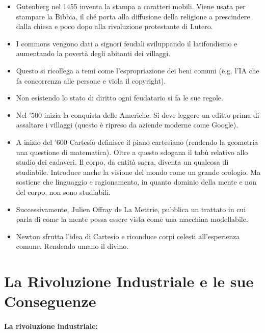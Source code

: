\begin{itemize}
  \item Gutenberg nel 1455 inventa la stampa a caratteri mobili. Viene usata per stampare la Bibbia, il ché porta alla diffusione della religione a prescindere dalla chiesa e poco dopo alla rivoluzione protestante di Lutero.
  \item I commons vengono dati a signori feudali sviluppando il latifondismo e aumentando la povertà degli abitanti dei villaggi. 
  \item Questo si ricollega a temi come l'espropriazione dei beni comuni (e.g. l'IA che fa concorrenza alle persone e viola il copyright).
  \item Non esistendo lo stato di diritto ogni feudatario si fa le sue regole.
  \item Nel '500 inizia la conquista delle Americhe. Si deve leggere un editto prima di assaltare i villaggi (questo è ripreso da aziende moderne come Google).
  \item A inizio del '600 Cartesio definisce il piano cartesiano (rendendo la geometria una questione di matematica). Oltre a questo sdogana il tabù relativo allo studio dei cadaveri. Il corpo, da entità sacra, diventa un qualcosa di studiabile. Introduce anche la visione del mondo come un grande orologio. Ma sostiene che linguaggio e ragionamento, in quanto dominio della mente e non del corpo, non sono studiabili.
  \item Successivamente, Julien Offray de La Mettrie, pubblica un trattato in cui parla di come la mente possa essere vista come una macchina modellabile. 
  \item Newton sfrutta l'idea di Cartesio e riconduce corpi celesti all'esperienza comune. Rendendo umano il divino. 
\end{itemize}

\section{La Rivoluzione Industriale e le sue Conseguenze}

\paragraph{La rivoluzione industriale:}

